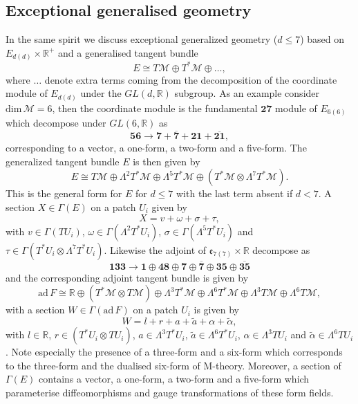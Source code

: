 \subsection{Exceptional generalised geometry}
In the same spirit we discuss exceptional generalized geometry ($d\leq 7$) based on $E_{d(d)}\times \mathbb{R}^+$ and a generalised tangent bundle 
\begin{equation}
    E\cong T\mathcal{M}\oplus T^*\mathcal{M}\oplus\ldots,
\end{equation}
where $\ldots$ denote extra terms coming from the decomposition of the coordinate module of $E_{d(d)}$ under the $GL(d,\mathbb{R})$ subgroup. As an example consider $\text{dim}\,\mathcal{M}=6$, then the coordinate module is the fundamental $\mathbf{27}$ module of $E_{6(6)}$ which decompose under $GL(6,\mathbb{R})$ as 
\begin{equation}
    \mathbf{56}\to \mathbf{7}+\overbar{\mathbf{7}}+\mathbf{21}+\overbar{\mathbf{21}},
\end{equation}
corresponding to a vector, a one-form, a two-form and a five-form. The generalized tangent bundle $E$ is then given by 
\begin{equation}
    E \cong T\mathcal{M}\oplus\Lambda^2T^*\mathcal{M}\oplus\Lambda^5T^*\mathcal{M}\oplus\left(T^*\mathcal{M}\otimes \Lambda^7T^*\mathcal{M}\right).
\end{equation}
This is the general form for $E$ for $d\leq7$ with the last term absent if $d<7$. A section $X\in\Gamma(E)$ on a patch $U_i$ given by 
\begin{equation}
    X = v+\omega+\sigma+\tau,
\end{equation}
with $v\in\Gamma(TU_i)$, $\omega\in\Gamma(\Lambda^2T^*U_i)$, $\sigma\in\Gamma(\Lambda^5T^*U_i)$ and $\tau \in\Gamma(T^*U_i\otimes \Lambda^7T^*U_i)$.  Likewise the adjoint of $\mathfrak{e}_{7(7)}\times\mathbb{R}$ decompose as
\begin{equation}
    \mathbf{133}\to \mathbf{1}\oplus\mathbf{48}\oplus\mathbf{7}\oplus\overbar{\mathbf{7}}\oplus\mathbf{35}\oplus\overbar{\mathbf{35}}
\end{equation}
and the corresponding adjoint tangent bundle is given by
\begin{equation}
    \text{ad}\, F \cong \mathbb{R}\oplus \left(T^*\mathcal{M}\otimes T\mathcal{M}\right)\oplus \Lambda^3 T^*\mathcal{M}\oplus\Lambda^6 T^*\mathcal{M}\oplus\Lambda^3 T\mathcal{M}\oplus\Lambda^6 T\mathcal{M},
\end{equation}
with a section $W\in\Gamma(\text{ad}\,F)$ on a patch $U_i$ is given by
\begin{equation}\label{eq:AdDecompE7}
    W = l+r+a+\tilde{a}+\alpha+\tilde{\alpha},
\end{equation}
with $l\in\mathbb{R}$, $r\in (T^*U_i\otimes TU_i)$, $a\in \Lambda^3 T^*U_i$, $\tilde{a}\in \Lambda^6 T^*U_i$, $\alpha\in\Lambda^3 TU_i$ and $\tilde{\alpha}\in\Lambda^6 TU_i$. Note especially the presence of a three-form and a six-form which corresponds to the three-form and the dualised six-form of M-theory. Moreover, a section of $\Gamma(E)$ contains a vector, a one-form, a two-form and a five-form which parameterise diffeomorphisms and gauge transformations of these form fields. 

